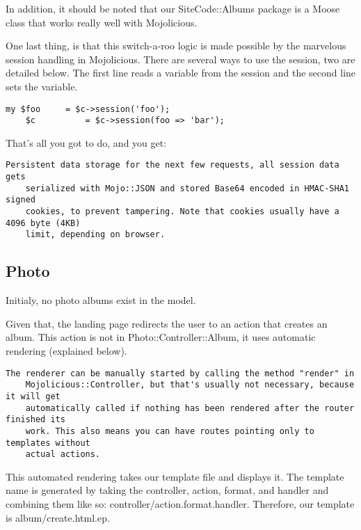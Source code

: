 \documentclass[14pt]{extreport}
\begin{document}
In addition, it should be noted that our SiteCode::Albums package is a Moose
class that works really well with Mojolicious.

One last thing, is that this switch-a-roo logic is made possible by the
marvelous session handling in Mojolicious.  There are several ways to use the
session, two are detailed below.  The first line reads a variable from the
session and the second line sets the variable.

\begin{lstlisting}[style=BlockStyle]
    my $foo     = $c->session('foo');
    $c          = $c->session(foo => 'bar');
\end{lstlisting}

That's all you got to do, and you get:

\begin{lstlisting}[style=BlockStyle]
    Persistent data storage for the next few requests, all session data gets
    serialized with Mojo::JSON and stored Base64 encoded in HMAC-SHA1 signed
    cookies, to prevent tampering. Note that cookies usually have a 4096 byte (4KB)
    limit, depending on browser.
\end{lstlisting}

\subsection{Photo}

Initialy, no photo albums exist in the model.

Given that, the landing page redirects the user to an action that creates an
album.  This action is not in Photo::Controller::Album, it uses automatic
rendering (explained below).

\begin{lstlisting}[style=BlockStyle]
    The renderer can be manually started by calling the method "render" in
    Mojolicious::Controller, but that's usually not necessary, because it will get
    automatically called if nothing has been rendered after the router finished its
    work. This also means you can have routes pointing only to templates without
    actual actions.
\end{lstlisting}

This automated rendering takes our template file and displays it.  The template
name is generated by taking the controller, action, format, and handler and
combining them like so: controller/action.format.handler.  Therefore, our
template is album/create.html.ep.
\end{document}
